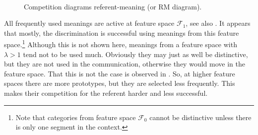 \begin{figure}[t]
\centering
{}
\\
\caption{Competition diagrams referent-meaning (or RM diagram).}
\label{f:st:compRC}
\end{figure}


All frequently used meanings are active at feature space ${\mathcal F}_1$, see also . It appears that mostly, the discrimination is successful using meanings from this feature space.\footnote{Note that categories from feature space ${\mathcal F}_0$ cannot be distinctive unless there is only one segment in the context.} Although this is not shown here, meanings from a feature space with $\lambda>1$ tend not to be used much. Obviously they may just as well be distinctive, but they are not used in the communication, otherwise they would move in the feature space. That this is not the case is observed in . So, at higher feature spaces there are more prototypes, but they are selected less frequently. This makes their competition for the referent harder and less successful.

